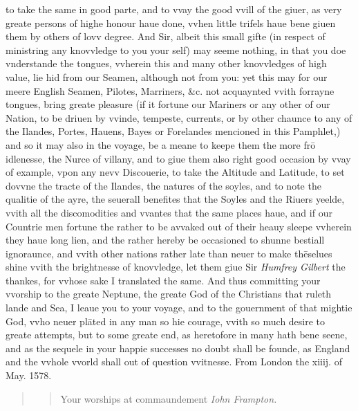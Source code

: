 \documentclass[11pt,twoside]{article}\makeatletter
\makeatletter
\def\chaptername{Chapter}
\def\mainmatter{%
  \cleardoublepage
  \def\thechapter{\@arabic\c@chapter}
  \setcounter{chapter}{0}
  \setcounter{section}{0}
  \pagenumbering{arabic}
  \setcounter{secnumdepth}{6}
  \def\@chapapp{\chaptername}%
  \def\theHchapter{\arabic{chapter}}
  \def\thesection{\@arabic\c@section}
  \def\theHsection{\arabic{section}}
}
\makeatother
\begin{document}
 to take the same in good parte, and to vvay the good vvill of the giuer, as very greate persons of highe honour haue done, vvhen little trifels haue bene giuen them by others of lovv degree. And Sir, albeit this small gifte (in respect of ministring any knovvledge to you your self) may seeme nothing, in that you doe vnderstande the tongues, vvherein this and many other knovvledges of high value, lie hid from our Seamen, although not from you: yet this may for our meere English Seamen, Pilotes, Marri­ners, \&c. not acquaynted vvith forrayne tongues, bring greate pleasure (if it fortune our Mariners or any other of our Nation, to be driuen by vvinde, tempeste, currents, or by other chaunce to any of the Ilandes, Portes, Hauens, Bayes or Forelandes mencioned in this Pamphlet,) and so it may also in the voyage, be a meane to keepe them the more frō idlenesse, the Nurce of villany, and to giue them also right good occasion by vvay of example, vpon any nevv Discouerie, to take the Altitude and La­titude, to set dovvne the tracte of the Ilandes, the natures of the soyles, and to note the qualitie of the ayre, the seuerall benefites that the Soyles and the Riuers yeelde, vvith all the discomodities and vvantes that the same places haue, and if our Coun­trie men fortune the rather to be avvaked out of their heauy sleepe vvherein they haue long lien, and the rather hereby be occasioned to shunne be­stiall ignoraunce, and vvith other nations rather late than neuer to make thēselues shine vvith the bright­nesse of knovvledge, let them giue Sir {\itshape Humfrey Gilbert} the thankes, for vvhose sake I translated the same. %
 And thus committing your vvorship to the greate Neptune, the greate God of the Christians that ru­leth lande and Sea, I leaue you to your voyage, and to the gouernment of that mightie God, vvho ne­uer plāted in any man so hie courage, vvith so much desire to greate attempts, but to some greate end, as heretofore in many hath bene seene, and as the se­quele in your happie successes no doubt shall be founde, as England and the vvhole vvorld shall out of question vvit­nesse. From London the xiiij. of May. 1578.

\begin{quote}

\begin{quote}
Your worships at commaundement {\itshape Iohn Frampton.}\end{quote}
\end{quote}
\mainmatter %
\end{document}
